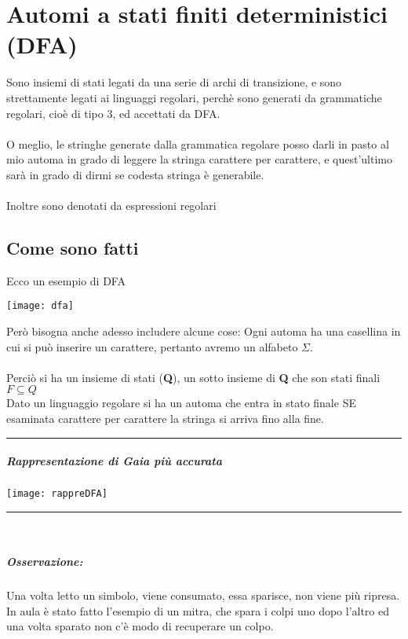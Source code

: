\documentclass[12pt, a4paper, openany, oneside]{book}
\begin{document}
\chapter{Automi a stati finiti deterministici (DFA)}
Sono insiemi di stati legati da una serie di archi di transizione, e sono 
strettamente legati ai linguaggi regolari, perchè sono generati da grammatiche 
regolari, cioè di tipo 3, ed accettati da DFA. \\ \\
O meglio, le stringhe generate dalla grammatica regolare posso darli in pasto
al mio automa in grado di leggere la stringa carattere per carattere, e 
quest'ultimo sarà in grado di dirmi se codesta stringa è generabile. \\ \\
Inoltre sono denotati da espressioni regolari
\section{Come sono fatti}
Ecco un esempio di DFA
\begin{center}
\texttt{[image: dfa]}
\end{center}
Però bisogna anche adesso includere alcune cose: 
Ogni automa ha una casellina in cui si può inserire un carattere, pertanto avremo
un alfabeto $\Sigma$.\\ \\
Perciò si ha un insieme di stati (\textbf{Q}), un sotto insieme di \textbf{Q} che
son stati finali $F\subseteq Q$ \\
Dato un linguaggio regolare si ha un automa che entra in stato finale SE esaminata
carattere per carattere la stringa si arriva fino alla fine.
\\
{\color{black} \rule{\linewidth}{0.3mm}}
\paragraph{Rappresentazione di Gaia più accurata}
\begin{center}
\texttt{[image: rappreDFA]}
\end{center}
{\color{black} \rule{\linewidth}{0.3mm}}
\\
\paragraph{Osservazione: } Una volta letto un simbolo, viene consumato, essa
sparisce, non viene più ripresa. In aula è stato fatto l'esempio di un mitra, che
spara i colpi uno dopo l'altro ed una volta sparato non c'è modo di recuperare
un colpo.
\end{document}
